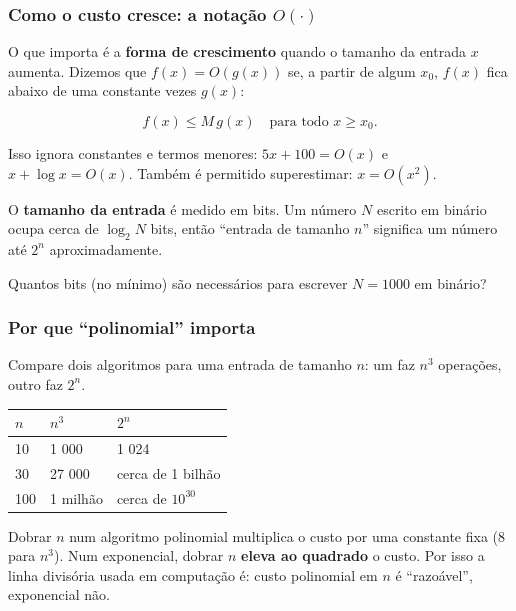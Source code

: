 \subsubsection{\texorpdfstring{Como o custo cresce: a notação \(O(\cdot)\)}{Como o custo cresce: a notação O(\textbackslash cdot)}}\label{como-o-custo-cresce-a-notauxe7uxe3o-ocdot}

O que importa é a \textbf{forma de crescimento} quando o tamanho da entrada \(x\) aumenta. Dizemos que \(f(x)=O(g(x))\) se, a partir de algum \(x_0\), \(f(x)\) fica abaixo de uma constante vezes \(g(x)\):

\[
f(x) \le M\, g(x) \quad \text{para todo } x \ge x_0 .
\]

Isso ignora constantes e termos menores: \(5x+100 = O(x)\) e \(x + \log x = O(x)\). Também é permitido superestimar: \(x = O(x^2)\).

O \textbf{tamanho da entrada} é medido em bits. Um número \(N\) escrito em binário ocupa cerca de \(\log_2 N\) bits, então ``entrada de tamanho \(n\)'' significa um número até \(2^n\) aproximadamente.

Quantos bits (no mínimo) são necessários para escrever \(N = 1000\) em binário?

\subsubsection{Por que ``polinomial'' importa}\label{por-que-polinomial-importa}

Compare dois algoritmos para uma entrada de tamanho \(n\): um faz \(n^3\) operações, outro faz \(2^n\).

\begin{center}\begin{tabular}{lll}
\hline
\(n\) & \(n^3\) & \(2^n\) \\
\hline

\hline

10 & 1 000 & 1 024 \\
30 & 27 000 & cerca de 1 bilhão \\
100 & 1 milhão & cerca de \(10^{30}\) \\
\end{tabular}\end{center}

Dobrar \(n\) num algoritmo polinomial multiplica o custo por uma constante fixa (\(8\) para \(n^3\)). Num exponencial, dobrar \(n\) \textbf{eleva ao quadrado} o custo. Por isso a linha divisória usada em computação é: custo polinomial em \(n\) é ``razoável'', exponencial não.

